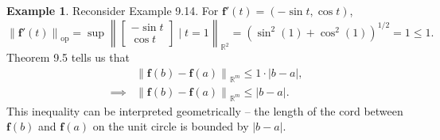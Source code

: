 \documentclass{article}
\newcommand{\R}{\mathbb{R}}
\newcommand{\f}{\mathbf{f}}
\newcommand{\norm}[1]{\left\lVert#1\right\rVert}
\newcommand{\normop}[1]{\left\lVert#1\right\rVert_\text{op}}
\theoremstyle{definition}
\newtheorem{example}{Example}[section]
\begin{document}
	\begin{example}
		Reconsider Example 9.14. For $ \f'(t)=(-\sin t,\cos t) $, $$\normop{\f'(t)}= \sup\norm{\begin{bmatrix}
				-\sin t\\ \cos t
			\end{bmatrix} \mid t = 1}_{\R^2} = (\sin^2(1)+\cos^2(1))^{1/2} = 1  \le 1 .$$
		Theorem 9.5 tells us that \begin{align*}
			&\norm{\f(b)-\f(a)}_{\R^m} \le 1\cdot |b-a| ,\\
			\implies & \norm{\f(b)-\f(a)}_{\R^m} \le  |b-a|. 
		\end{align*}
		This inequality can be interpreted geometrically -- the length of the cord between $ \f(b) $ and $ \f(a) $ on the unit circle is bounded by $ |b-a| $. 
		
	\end{example}
\end{document}
